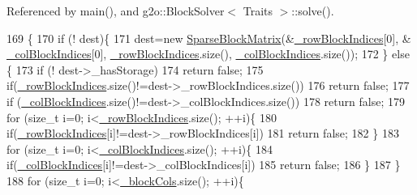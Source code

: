 Referenced by main(), and g2o\+::\+Block\+Solver$<$ Traits $>$\+::solve().


\begin{DoxyCode}
169                                                                         \{
170     \textcolor{keywordflow}{if} (! dest)\{
171       dest=\textcolor{keyword}{new} \hyperlink{classg2o_1_1SparseBlockMatrix_af9b8a9cb09a88bc444775a9974db8760}{SparseBlockMatrix}(&\hyperlink{classg2o_1_1SparseBlockMatrix_ab0bd9c6d5b7b8704af1bc679032382e3}{\_rowBlockIndices}[0], &
      \hyperlink{classg2o_1_1SparseBlockMatrix_aca008740c37d2d00b90f696ab19abb59}{\_colBlockIndices}[0], \hyperlink{classg2o_1_1SparseBlockMatrix_ab0bd9c6d5b7b8704af1bc679032382e3}{\_rowBlockIndices}.size(), 
      \hyperlink{classg2o_1_1SparseBlockMatrix_aca008740c37d2d00b90f696ab19abb59}{\_colBlockIndices}.size());
172     \} \textcolor{keywordflow}{else} \{
173       \textcolor{keywordflow}{if} (! dest->\_hasStorage)
174         \textcolor{keywordflow}{return} \textcolor{keyword}{false};
175       \textcolor{keywordflow}{if}(\hyperlink{classg2o_1_1SparseBlockMatrix_ab0bd9c6d5b7b8704af1bc679032382e3}{\_rowBlockIndices}.size()!=dest->\_rowBlockIndices.size())
176         \textcolor{keywordflow}{return} \textcolor{keyword}{false};
177       \textcolor{keywordflow}{if} (\hyperlink{classg2o_1_1SparseBlockMatrix_aca008740c37d2d00b90f696ab19abb59}{\_colBlockIndices}.size()!=dest->\_colBlockIndices.size())
178         \textcolor{keywordflow}{return}  \textcolor{keyword}{false};
179       \textcolor{keywordflow}{for} (\textcolor{keywordtype}{size\_t} i=0; i<\hyperlink{classg2o_1_1SparseBlockMatrix_ab0bd9c6d5b7b8704af1bc679032382e3}{\_rowBlockIndices}.size(); ++i)\{
180         \textcolor{keywordflow}{if}(\hyperlink{classg2o_1_1SparseBlockMatrix_ab0bd9c6d5b7b8704af1bc679032382e3}{\_rowBlockIndices}[i]!=dest->\_rowBlockIndices[i])
181           \textcolor{keywordflow}{return} \textcolor{keyword}{false};
182       \}
183       \textcolor{keywordflow}{for} (\textcolor{keywordtype}{size\_t} i=0; i<\hyperlink{classg2o_1_1SparseBlockMatrix_aca008740c37d2d00b90f696ab19abb59}{\_colBlockIndices}.size(); ++i)\{
184         \textcolor{keywordflow}{if}(\hyperlink{classg2o_1_1SparseBlockMatrix_aca008740c37d2d00b90f696ab19abb59}{\_colBlockIndices}[i]!=dest->\_colBlockIndices[i])
185           \textcolor{keywordflow}{return} \textcolor{keyword}{false};
186       \}
187     \}
188     \textcolor{keywordflow}{for} (\textcolor{keywordtype}{size\_t} i=0; i<\hyperlink{classg2o_1_1SparseBlockMatrix_ae236d56a01ba4d292450a518621b41f8}{\_blockCols}.size(); ++i)\{

\end{DoxyCode}
